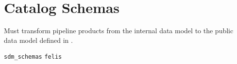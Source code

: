 \section{Catalog Schemas}

Must transform pipeline products from the internal data model to the public data model defined in \citet{LSE-163}.

\texttt{sdm\_schemas}
\texttt{felis}
